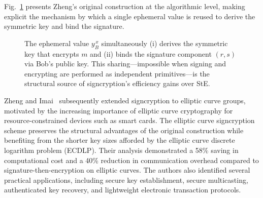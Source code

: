 \documentclass[conference]{IEEEtran}
\begin{document}
Fig.~\ref{fig:zheng_alg} presents Zheng's original construction at the algorithmic level, making explicit the mechanism by which a single ephemeral value is reused to derive the symmetric key and bind the signature.

\begin{figure}[t]
\centering
{}
\caption{The ephemeral value $y_B^{\,x}$ simultaneously (i) derives the symmetric key that encrypts $m$ and (ii) binds the signature component $(r, s)$ via Bob's public key. This sharing---impossible when signing and encrypting are performed as independent primitives---is the structural source of signcryption's efficiency gains over StE.}
\label{fig:zheng_alg}
\end{figure}

Zheng and Imai~\cite{zheng1998} subsequently extended signcryption to elliptic curve groups, motivated by the increasing importance of elliptic curve cryptography for resource-constrained devices such as smart cards. The elliptic curve signcryption scheme preserves the structural advantages of the original construction while benefiting from the shorter key sizes afforded by the elliptic curve discrete logarithm problem (ECDLP). Their analysis demonstrated a 58\% saving in computational cost and a 40\% reduction in communication overhead compared to signature-then-encryption on elliptic curves. The authors also identified several practical applications, including secure key establishment, secure multicasting, authenticated key recovery, and lightweight electronic transaction protocols.
\end{document}
